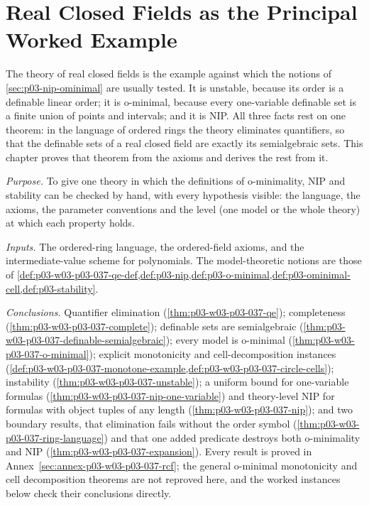 \chapter{Real Closed Fields as the Principal Worked Example}
\label{sec:p03-w03-p03-037-rcf}

The theory of real closed fields is the example against which the notions of
\cref{sec:p03-nip-ominimal} are usually tested.  It is unstable, because its
order is a definable linear order; it is o-minimal, because every
one-variable definable set is a finite union of points and intervals; and it
is NIP.  All three facts rest on one theorem: in the language of ordered
rings the theory eliminates quantifiers, so that the definable sets of a real
closed field are exactly its semialgebraic sets.  This chapter proves that
theorem from the axioms and derives the rest from it.

\emph{Purpose.}  To give one theory in which the definitions of o-minimality,
NIP and stability can be checked by hand, with every hypothesis visible: the
language, the axioms, the parameter conventions and the level (one model or
the whole theory) at which each property holds.

\emph{Inputs.}  The ordered-ring language, the ordered-field axioms, and the
intermediate-value scheme for polynomials.  The model-theoretic notions are
those of \cref{def:p03-w03-p03-037-qe-def,def:p03-nip,def:p03-o-minimal,def:p03-ominimal-cell,def:p03-stability}.

\emph{Conclusions.}  Quantifier elimination
(\cref{thm:p03-w03-p03-037-qe}); completeness
(\cref{thm:p03-w03-p03-037-complete}); definable sets are semialgebraic
(\cref{thm:p03-w03-p03-037-definable-semialgebraic}); every model is
o-minimal (\cref{thm:p03-w03-p03-037-o-minimal}); explicit monotonicity and
cell-decomposition instances (\cref{def:p03-w03-p03-037-monotone-example,def:p03-w03-p03-037-circle-cells}); instability
(\cref{thm:p03-w03-p03-037-unstable}); a uniform bound for one-variable
formulas (\cref{thm:p03-w03-p03-037-nip-one-variable}) and theory-level NIP
for formulas with object tuples of any length
(\cref{thm:p03-w03-p03-037-nip}); and two boundary results, that elimination
fails without the order symbol (\cref{thm:p03-w03-p03-037-ring-language}) and
that one added predicate destroys both o-minimality and NIP
(\cref{thm:p03-w03-p03-037-expansion}).  Every result is proved in
Annex~\ref{sec:annex-p03-w03-p03-037-rcf}; the general o-minimal monotonicity
and cell decomposition theorems are not reproved here, and the worked
instances below check their conclusions directly.

